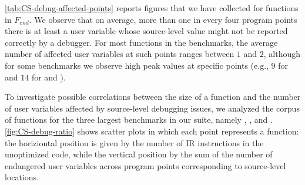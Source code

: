 \mytable\ref{tab:CS-debug-affected-points} reports figures that we have collected for functions in $F_{end}$. We observe that on average, more than one in every four program points there is at least a user variable whose source-level value might not be reported correctly by a debugger. For most functions in the benchmarks, the average number of affected user variables at such points ranges between $1$ and $2$, although for some benchmarks we observe high peak values at specific points (e.g., $9$ for  and $14$ for  and ).

To investigate possible correlations between the size of a function and the number of user variables affected by source-level debugging issues, we analyzed the corpus of functions for the three largest benchmarks in our suite, namely , , and . \myfigure\ref{fig:CS-debug-ratio} shows scatter plots in which each point represents a function: the horiziontal position is given by the number of IR instructions in the unoptimized code, while the vertical position by the sum of the number of endangered user variables across program points corresponding to source-level locations.

